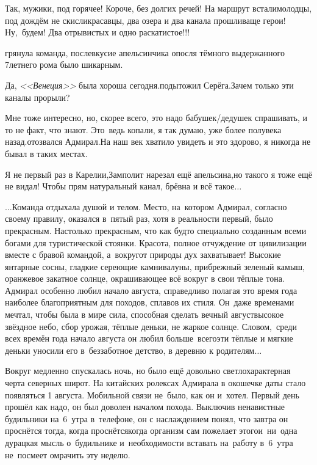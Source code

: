 \diagdash Так, мужики, под горячее! Короче, без долгих речей! На маршрут встали\mdash молодцы, под дождём не скисли\mdash красавцы, два озера и два канала прошли\mdash ваще герои! Ну,~будем! Два отрывистых и одно раскатистое!!!

\mdash грянула команда, послевкусие апельсинчика опосля тёмного выдержанного 7\sdash летнего рома было шикарным.

\diagdash Да, \textit{<<Венеция>>} была хороша сегодня.\mdash подытожил Серёга.\mdash Зачем только эти каналы прорыли?

\diagdash Мне тоже интересно, но, скорее всего, это надо бабушек/дедушек спрашивать, и то не факт, что знают. Это~ведь копали, я так думаю, уже более полувека назад.\mdash отозвался Адмирал.\mdash На наш век хватило увидеть и это здорово, я никогда не бывал в таких местах.

\diagdash Я не первый раз в Карелии,\mdash Замполит нарезал ещё апельсина,\mdash но такого я тоже ещё не видал! Чтобы прям натуральный канал, брёвна и всё такое$\ldots$

\vspace{0.2cm}
$\ldots$Команда отдыхала душой и телом. Место, на~котором Адмирал, согласно своему правилу, оказался в~пятый раз, хотя в реальности первый, было прекрасным. Настолько прекрасным, что как будто специально созданным всеми богами для туристической стоянки. Красота, полное отчуждение от цивилизации вместе с бравой командой, а~вокруг\mdash от природы дух захватывает! Высокие янтарные сосны, гладкие сереющие камни\sdash валуны, прибрежный зеленый камыш, оранжевое закатное солнце, окрашивающее всё вокруг в свои тёплые тона. Адмирал особенно любил начало августа, справедливо полагая это время года наиболее благоприятным для походов, сплавов их стиля. Он~даже временами мечтал, чтобы была в мире сила, способная сделать вечный август\mdash высокое звёздное небо, сбор урожая, тёплые деньки, не жаркое солнце. Словом,~среди всех времён года начало августа он любил больше~всего\mdash эти тёплые и мягкие деньки уносили его в~беззаботное детство, в деревню к родителям$\ldots$

Вокруг медленно спускалась ночь, но было ещё довольно светло\mdash характерная черта северных широт. На китайских ролексах Адмирала в окошечке даты стало появляться 1 августа. Мобильной связи не~было, как он и~хотел. Первый день прошёл как надо, он был доволен началом похода. Выключив ненавистные будильники на~6~утра в~телефоне, он с наслаждением понял, что завтра он проснётся тогда, когда проснётся\mdash когда организм сам пожелает этого\mdash и~ни~одна дурацкая мысль о~будильнике и~необходимости вставать на~работу в~6~утра не~посмеет омрачить эту неделю. 

\begin{center}
\end{center}